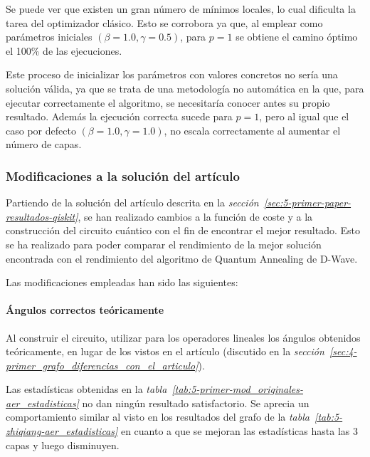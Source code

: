 Se puede ver que existen un gran número de mínimos locales, lo cual dificulta la tarea del optimizador clásico. Esto se corrobora ya que, al emplear como parámetros iniciales $(\beta = 1.0, \gamma = 0.5)$, para $p = 1$ se obtiene el camino óptimo el 100\% de las ejecuciones.

Este proceso de inicializar los parámetros con valores concretos no sería una solución válida, ya que se trata de una metodología no automática en la que, para ejecutar correctamente el algoritmo, se necesitaría conocer antes su propio resultado. Además la ejecución correcta sucede para $p = 1$, pero al igual que el caso por defecto $(\beta = 1.0, \gamma = 1.0)$, no escala correctamente al aumentar el número de capas.

\subsubsection{Modificaciones a la solución del artículo}
Partiendo de la solución del artículo descrita en la \textit{sección~\ref{sec:5-primer-paper-resultados-qiskit}}, se han realizado cambios a la función de coste y a la construcción del circuito cuántico con el fin de encontrar el mejor resultado. Esto se ha realizado para poder comparar el rendimiento de la mejor solución encontrada con el rendimiento del algoritmo de Quantum Annealing de D-Wave.

Las modificaciones empleadas han sido las siguientes:

\paragraph{Ángulos correctos teóricamente}
Al construir el circuito, utilizar para los operadores lineales los ángulos obtenidos teóricamente, en lugar de los vistos en el artículo (discutido en la \textit{sección~\ref{sec:4-primer_grafo_diferencias_con_el_articulo}}).

Las estadísticas obtenidas en la \textit{tabla~\ref{tab:5-primer-mod_originales-aer_estadisticas}} no dan ningún resultado satisfactorio.
Se aprecia un comportamiento similar al visto en los resultados del grafo de la \textit{tabla~\ref{tab:5-zhiqiang-aer_estadisticas}} en cuanto a que se mejoran las estadísticas hasta las 3 capas y luego disminuyen.

